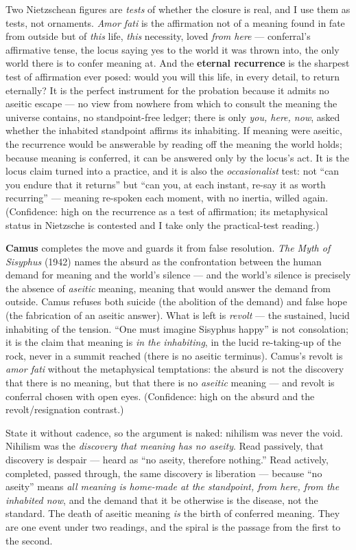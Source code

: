 \documentclass[11pt]{article}
\begin{document}
Two Nietzschean figures are \emph{tests} of whether the closure is real, and I use them as tests, not ornaments. \emph{Amor fati} is the affirmation not of a meaning found in fate from outside but of \emph{this} life, \emph{this} necessity, loved \emph{from here} — conferral's affirmative tense, the locus saying yes to the world it was thrown into, the only world there is to confer meaning at. And the \textbf{eternal recurrence} is the sharpest test of affirmation ever posed: would you will this life, in every detail, to return eternally? It is the perfect instrument for the probation because it admits no aseitic escape — no view from nowhere from which to consult the meaning the universe contains, no standpoint-free ledger; there is only \emph{you, here, now}, asked whether the inhabited standpoint affirms its inhabiting. If meaning were aseitic, the recurrence would be answerable by reading off the meaning the world holds; because meaning is conferred, it can be answered only by the locus's act. It is the locus claim turned into a practice, and it is also the \emph{occasionalist} test: not ``can you endure that it returns'' but ``can you, at each instant, re-say it as worth recurring'' — meaning re-spoken each moment, with no inertia, willed again. (Confidence: high on the recurrence as a test of affirmation; its metaphysical status in Nietzsche is contested and I take only the practical-test reading.)

\textbf{Camus} completes the move and guards it from false resolution. \emph{The Myth of Sisyphus} (1942) names the absurd as the confrontation between the human demand for meaning and the world's silence — and the world's silence is precisely the absence of \emph{aseitic} meaning, meaning that would answer the demand from outside. Camus refuses both suicide (the abolition of the demand) and false hope (the fabrication of an aseitic answer). What is left is \emph{revolt} — the sustained, lucid inhabiting of the tension. ``One must imagine Sisyphus happy'' is not consolation; it is the claim that meaning is \emph{in the inhabiting}, in the lucid re-taking-up of the rock, never in a summit reached (there is no aseitic terminus). Camus's revolt is \emph{amor fati} without the metaphysical temptations: the absurd is not the discovery that there is no meaning, but that there is no \emph{aseitic} meaning — and revolt is conferral chosen with open eyes. (Confidence: high on the absurd and the revolt/\allowbreak{}resignation contrast.)

State it without cadence, so the argument is naked: nihilism was never the void. Nihilism was the \emph{discovery that meaning has no aseity}. Read passively, that discovery is despair — heard as ``no aseity, therefore nothing.'' Read actively, completed, passed through, the same discovery is liberation — because ``no aseity'' means \emph{all meaning is home-made at the standpoint, from here, from the inhabited now}, and the demand that it be otherwise is the disease, not the standard. The death of aseitic meaning \emph{is} the birth of conferred meaning. They are one event under two readings, and the spiral is the passage from the first to the second.
\end{document}
